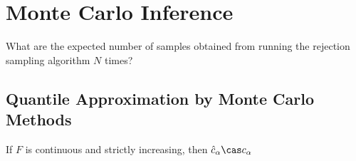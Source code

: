 
\chapter{Monte Carlo Inference}
\label{cha:monte-carlo-infer}

\begin{exer}
  What are the expected number of samples obtained from running the
rejection sampling algorithm $N$ times?
\end{exer}



\section{Quantile Approximation by Monte Carlo Methods}
\label{sec:quant-appr-monte}


\begin{thm}
  \label{defn:monte_carlo:1}
  If $F$ is continuous and strictly increasing, then $\hat c_{\alpha}
  \cas c_{\alpha}$
\end{thm}

